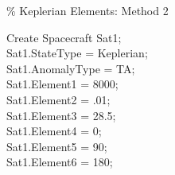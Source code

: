 \noindent \%  Keplerian Elements: Method 2\\
\begin{ScriptType}
Create Spacecraft Sat1;\\
Sat1.StateType   = Keplerian;\\
Sat1.AnomalyType = TA; \\   %
Sat1.Element1 = 8000;   \\  %
Sat1.Element2 = .01;   \\  %
Sat1.Element3 = 28.5;  \\   %
Sat1.Element4 = 0;     \\   %
Sat1.Element5 = 90;    \\   %
Sat1.Element6 = 180;   \\   %
\end{ScriptType}
